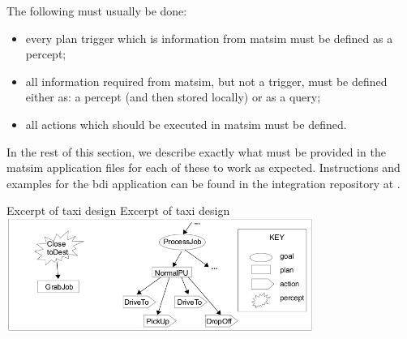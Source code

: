 The following must usually be done:
\begin{itemize}\styleItemize
\item every plan trigger which is information from \gls{matsim} must
be defined as a percept; 
\item all information required from
\gls{matsim}, but not a trigger, must be defined either as: a
percept (and then stored locally) or as a query; 
\item all actions which should be executed in \gls{matsim} must be defined.
\end{itemize}
%
In the rest of this section, we describe exactly what must be provided
in the \gls{matsim} application files for each of these to work as
expected. Instructions and examples for the \gls{bdi} application can be
found in the integration repository at \url{}.


\createfigure%
{Excerpt of taxi design}%
{Excerpt of taxi design}%
{\label{taxigptree}}%
{\includegraphics[width=0.75\textwidth]{extending/figures/bdi/fig-taxi-gptree.jpg}}%
{}

